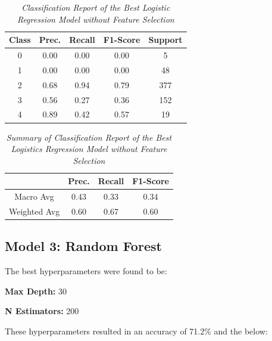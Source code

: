 \documentclass[11pt]{article}
\begin{document}
\begin{table}[!ht]
    \begin{center}
        \begin{tabular}{c|c|c|c|c}			
            \hline
            Class & Prec. & Recall & F1-Score & Support \\
            \hline\hline
            0 & 0.00 & 0.00 & 0.00 & 5 \\
            1 & 0.00 & 0.00 & 0.00 & 48 \\
            2 & 0.68 & 0.94 & 0.79 & 377 \\
            3 & 0.56 & 0.27 & 0.36 & 152 \\
            4 & 0.89 & 0.42 & 0.57 & 19\\
                \hline
        \end{tabular}

        \caption{\textit{Classification Report of the Best Logistic Regression Model without Feature Selection}}
        \label{logr-ft-report}

    \end{center}
\end{table}
\begin{table}[!ht]
    \begin{center}
        \begin{tabular}{c||c|c|c}			
            \hline
             & Prec. & Recall & F1-Score \\
            \hline\hline
            Macro Avg & 0.43 & 0.33 & 0.34 \\
            Weighted Avg & 0.60 & 0.67 & 0.60 \\
                \hline
        \end{tabular}

        \caption{\textit{Summary of Classification Report of the Best Logistics Regression Model without Feature Selection}}
        \label{logr-ft-report-sum}

    \end{center}
\end{table}


\subsection{Model 3: Random Forest}
The best hyperparameters were found to be:

\textbf{Max Depth: } 30

\textbf{N Estimators: } 200

\noindent
These hyperparameters resulted in an accuracy of 71.2\% and the below:
\end{document}
